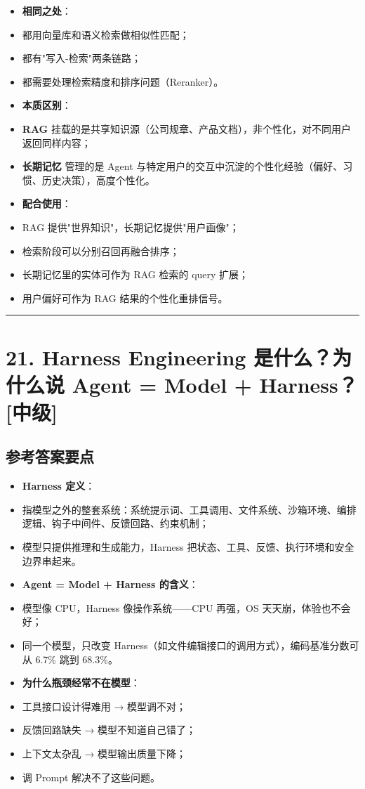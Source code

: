 \documentclass[9pt,a4paper,twocolumn]{ctexart}
\newcommand{\lvzhong}{\usebox{\badgezhongbox}}
\def\lvzhong{[中级]}%
\begin{document}
\begin{itemize}[itemsep=1pt, topsep=2pt]
  \item \textbf{相同之处}：
  \item 都用向量库和语义检索做相似性匹配；
  \item 都有"写入-检索"两条链路；
  \item 都需要处理检索精度和排序问题（Reranker）。
  \item \textbf{本质区别}：
  \item \textbf{RAG} 挂载的是共享知识源（公司规章、产品文档），非个性化，对不同用户返回同样内容；
  \item \textbf{长期记忆} 管理的是 Agent 与特定用户的交互中沉淀的个性化经验（偏好、习惯、历史决策），高度个性化。
  \item \textbf{配合使用}：
  \item RAG 提供"世界知识"，长期记忆提供"用户画像"；
  \item 检索阶段可以分别召回再融合排序；
  \item 长期记忆里的实体可作为 RAG 检索的 query 扩展；
  \item 用户偏好可作为 RAG 结果的个性化重排信号。
\end{itemize}


\vspace{2pt}
\noindent\rule{\columnwidth}{0.3pt}\vspace{2pt}





\section*{21. Harness Engineering 是什么？为什么说 Agent = Model + Harness？ \lvzhong{}}


\subsection*{参考答案要点}

\begin{itemize}[itemsep=1pt, topsep=2pt]
  \item \textbf{Harness 定义}：
  \item 指模型之外的整套系统：系统提示词、工具调用、文件系统、沙箱环境、编排逻辑、钩子中间件、反馈回路、约束机制；
  \item 模型只提供推理和生成能力，Harness 把状态、工具、反馈、执行环境和安全边界串起来。
  \item \textbf{Agent = Model + Harness 的含义}：
  \item 模型像 CPU，Harness 像操作系统——CPU 再强，OS 天天崩，体验也不会好；
  \item 同一个模型，只改变 Harness（如文件编辑接口的调用方式），编码基准分数可从 6.7\% 跳到 68.3\%。
  \item \textbf{为什么瓶颈经常不在模型}：
  \item 工具接口设计得难用 → 模型调不对；
  \item 反馈回路缺失 → 模型不知道自己错了；
  \item 上下文太杂乱 → 模型输出质量下降；
  \item 调 Prompt 解决不了这些问题。
\end{itemize}
\end{document}
